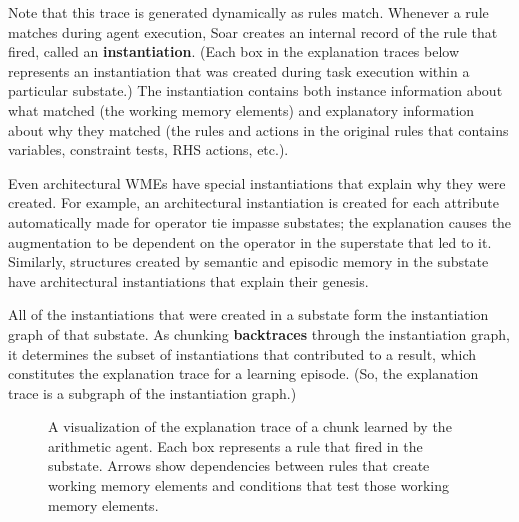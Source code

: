 Note that this trace is generated dynamically as rules match.  Whenever a rule matches during agent execution, Soar creates an internal record of the rule that fired, called an \textbf{instantiation}.  (Each box in the explanation traces below represents an instantiation that was created during task execution within a particular substate.) The instantiation contains both instance information about what matched (the working memory elements) and explanatory information about why they matched (the rules and actions in the original rules that contains variables, constraint tests, RHS actions, etc.).  

Even architectural WMEs have special instantiations that explain why they were created.  For example, an architectural instantiation is created for each  attribute automatically made for operator tie impasse substates; the explanation causes the  augmentation to be dependent on the operator in the superstate that led to it.  Similarly, structures created by semantic and episodic memory in the substate have architectural instantiations that explain their genesis.

All of the instantiations that were created in a substate form the instantiation graph of that substate.  As chunking \textbf{backtraces} through the instantiation graph, it determines the subset of instantiations that contributed to a result, which constitutes the explanation trace for a learning episode.  (So, the explanation trace is a subgraph of the instantiation graph.)

\begin{figure}
	\label{fig:chunking-wm-vs-exp}
\end{figure}

\begin{figure}
	\caption{A visualization of the explanation trace of a chunk learned by the arithmetic agent.  Each box represents a rule that fired in the substate.  Arrows show dependencies between rules that create working memory elements and conditions that test those working memory elements.}
	\label{fig:chunking-trace}
\end{figure}

